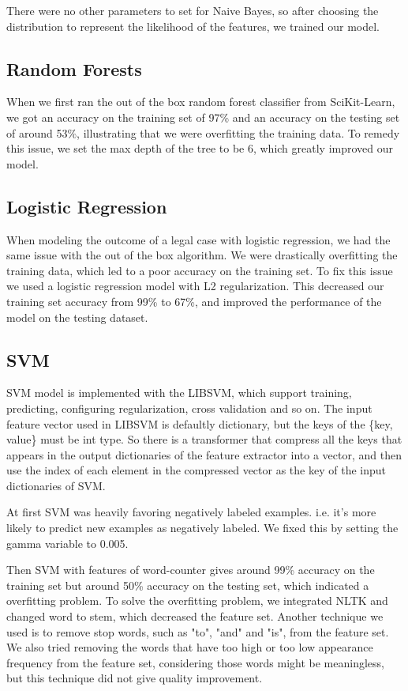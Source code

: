 \documentclass[journal]{IEEEtran}
\begin{document}
There were no other parameters to set for Naive Bayes, so after choosing the distribution to represent the likelihood of the features, we trained our model.

\subsection{Random Forests}

When we first ran the out of the box random forest classifier from SciKit-Learn, we got an accuracy on the training set of 97\% and an accuracy on the testing set of around 53\%, illustrating that we were overfitting the training data. To remedy this issue, we set the max depth of the tree to be 6, which greatly improved our model. 

\subsection{Logistic Regression}

When modeling the outcome of a legal case with logistic regression, we had the same issue with the out of the box algorithm. We were drastically overfitting the training data, which led to a poor accuracy on the training set. To fix this issue we used a logistic regression model with L2 regularization. This decreased our training set accuracy from 99\% to 67\%, and improved the performance of the model on the testing dataset. 

\subsection{SVM}

SVM model is implemented with the LIBSVM, which support training, predicting, configuring regularization, cross validation and so on. The input feature vector used in LIBSVM is defaultly dictionary, but the keys of the \{key, value\} must be int type.
So there is a transformer that compress all the keys that appears in the output dictionaries of the feature extractor into a vector, and then use the index of each element in the compressed vector as the key of the input dictionaries of SVM. 

At first SVM was heavily favoring negatively labeled examples. i.e. it's more likely to predict new examples as negatively labeled. We fixed this by setting the gamma variable to 0.005.

Then SVM with features of word-counter gives around 99\% accuracy on the training set but around 50\% accuracy on the testing set, which indicated a overfitting problem. To solve the overfitting problem, we integrated NLTK and changed word to stem, which decreased the feature set. Another technique we used is to remove stop words, such as "to", "and" and "is", from the feature set. We also tried removing the words that have too high or too low appearance frequency from the feature set, considering those words might be meaningless, but this technique did not give quality improvement.
\end{document}
